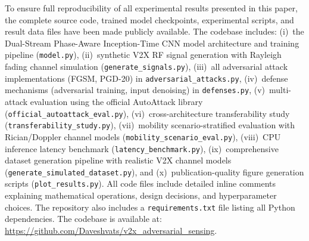 \documentclass[conference]{IEEEtran}
\begin{document}
To ensure full reproducibility of all experimental results presented in this paper, the complete source code, trained model checkpoints, experimental scripts, and result data files have been made publicly available. The codebase includes: (i)~the Dual-Stream Phase-Aware Inception-Time CNN model architecture and training pipeline (\texttt{model.py}), (ii)~synthetic V2X RF signal generation with Rayleigh fading channel simulation (\texttt{generate\_signals.py}), (iii)~all adversarial attack implementations (FGSM, PGD-20) in \texttt{adversarial\_attacks.py}, (iv)~defense mechanisms (adversarial training, input denoising) in \texttt{defenses.py}, (v)~multi-attack evaluation using the official AutoAttack library (\texttt{official\_autoattack\_eval.py}), (vi)~cross-architecture transferability study (\texttt{transferability\_study.py}), (vii)~mobility scenario-stratified evaluation with Rician/Doppler channel models (\texttt{mobility\_scenario\_eval.py}), (viii)~CPU inference latency benchmark (\texttt{latency\_benchmark.py}), (ix)~comprehensive dataset generation pipeline with realistic V2X channel models (\texttt{generate\_simulated\_dataset.py}), and (x)~publication-quality figure generation scripts (\texttt{plot\_results.py}). All code files include detailed inline comments explaining mathematical operations, design decisions, and hyperparameter choices. The repository also includes a \texttt{requirements.txt} file listing all Python dependencies. The codebase is available at: \url{https://github.com/Daveshvats/v2x_adversarial_sensing}.
\end{document}
